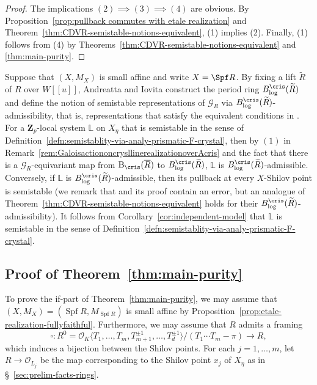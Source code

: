 \begin{proof}
The implications $(2)\implies(3)\implies(4)$ are obvious.
By Proposition~\ref{prop:pullback commutes with etale realization} and Theorem~\ref{thm:CDVR-semistable-notions-equivalent}, (1) implies (2). Finally, (1) follows from (4) by Theorems~\ref{thm:CDVR-semistable-notions-equivalent} and \ref{thm:main-purity}.
\end{proof}

\begin{rem} \label{rem:Andreatta-Iovita-semistability}
Suppose that $(X, M_X)$ is small affine and write $X = \Spf R$. By fixing a lift $\widetilde{R}$ of $R$ over $W[\![u]\!]$, Andreatta and Iovita construct the period ring $B_{\mathrm{log}}^{\cris}(\widetilde{R})$ and define the notion of semistable representations of $\mathcal{G}_R$ via $B_{\mathrm{log}}^{\cris}(\widetilde{R})$-admissibility, that is, representations that satisfy the equivalent conditions in \cite[Prop.~3.60]{andreatta-iovita-semistable-relative}. For a $\mathbf{Z}_p$-local system $\mathbb{L}$ on $X_{\eta}$ that is semistable in the sense of Definition~\ref{defn:semistablity-via-analy-prismatic-F-crystal}, then by $(1)$ in Remark~\ref{rem:GaloisactiononcrysllinerealizationoverAcris} and the fact that there is a $\mathcal{G}_R$-equivariant map from 
$\mathrm{B}_{\cris}(\overline{R})$ to $B_{\mathrm{log}}^{\cris}(\widetilde{R})$, $\mathbb{L}$ is $B_{\mathrm{log}}^{\cris}(\widetilde{R})$-admissible. Conversely, if $\mathbb{L}$ is $B_{\mathrm{log}}^{\cris}(\widetilde{R})$-admissible, then its pullback at every $X$-Shilov point is semistable (we remark that \cite[Prop.~3.62(i)]{andreatta-iovita-semistable-relative} and its proof contain an error, but an analogue of Theorem~\ref{thm:CDVR-semistable-notions-equivalent} holds for their $B_{\mathrm{log}}^{\cris}(\widetilde{R})$-admissibility). It follows from Corollary~\ref{cor:independent-model} that $\mathbb{L}$ is semistable in the sense of Definition~\ref{defn:semistablity-via-analy-prismatic-F-crystal}.  
\end{rem}

\subsection{Proof of Theorem~\ref{thm:main-purity}} \label{sec:proof-purity}

To prove the if-part of Theorem~\ref{thm:main-purity}, we may assume that $(X, M_X) = (\operatorname{Spf}R, M_{\operatorname{Spf}R})$ is small affine by Proposition~\ref{prop:etale-realization-fullyfaithful}. Furthermore, we may assume that $R$ admits a framing
\[
\square\colon R^{0} = \mathcal{O}_K \langle T_1, \ldots, T_m, T_{m+1}^{\pm 1}, \ldots, T_d^{\pm 1}\rangle / (T_1\cdots T_m - \pi) \rightarrow R,
\]
which induces a bijection between the Shilov points. For each $j = 1, \ldots, m$, let $R \rightarrow \mathcal{O}_{L_j}$ be the map corresponding to the Shilov point $x_j$ of $X_{\eta}$ as in \S~\ref{sec:prelim-facts-rings}. 

